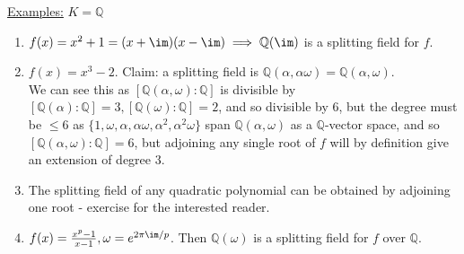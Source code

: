 \documentclass[a4paper, 10pt, twocolumn]{amsart}
\begin{document}
\underline{Examples:} $K = \mathbb{Q}$
\begin{enumerate}
\item $f(x) = x^2+1 = (x+\im)(x-\im) \implies \mathbb{Q}(\im)$ is a splitting field for $f$.
\item $f(x) = x^3-2$. Claim: a splitting field is $\mathbb{Q}(\alpha, \alpha\omega) = \mathbb{Q}(\alpha,\omega)$.\\
We can see this as $[\mathbb{Q}(\alpha,\omega):\mathbb{Q}]$ is divisible by $[\mathbb{Q}(\alpha):\mathbb{Q}]=3, [\mathbb{Q}(\omega):\mathbb{Q}] = 2$, and so divisible by $6$, but the degree must be $\leq 6$ as $\{1, \omega, \alpha, \alpha\omega, \alpha^2, \alpha^2\omega\}$ span $\mathbb{Q}(\alpha,\omega)$ as a $\mathbb{Q}$-vector space, and so $[\mathbb{Q}(\alpha,\omega):\mathbb{Q}]=6$, but adjoining any single root of $f$ will by definition give an extension of degree $3$.
\item The splitting field of any quadratic polynomial can be obtained by adjoining one root - exercise for the interested reader.
\item $f(x) = \frac{x^p-1}{x-1}, \omega = e^{2\pi\im/p}$. Then $\mathbb{Q}(\omega)$ is a splitting field for $f$ over $\mathbb{Q}$.
\end{enumerate}
\end{document}
